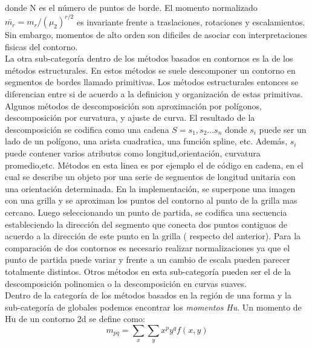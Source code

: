 donde N es el número de puntos de borde. El momento normalizado $\bar{m_r}=m_r / (\mu_2)^{r/2}$
es invariante frente a traslaciones, rotaciones y escalamientos. Sin embargo, momentos de alto orden
son dificiles de asociar con interpretaciones fisicas del contorno.\\
\indent La otra sub-categoría dentro de los métodos basados en contornos es la de los métodos estructurales.
En estos métodos se suele descomponer un contorno en segmentos de bordes llamado primitivas. Los métodos estructurales
entonces se diferencian entre si de acuerdo a la definicion y organización de estas primitivas. Algunos métodos
de descomposición son aproximación por polígonos, descomposición por curvatura, y ajuste de curva. El resultado
de la descomposición se codifica como una cadena $S=s_1,s_2...s_n$ donde $s_i$ puede ser un lado de un polígono, una 
arista cuadratica, una función spline, etc. Además, $s_i$ puede contener varios atributos como longitud,orientación, curvatura promedio,etc.
Métodos en esta linea es por ejemplo el de código en cadena, en el cual se describe un objeto por una serie de segmentos de longitud unitaria
con una orientación determinada. En la implementación, se superpone una imagen con una grilla y se aproximan los puntos del contorno al 
punto de la grilla mas cercano. Luego seleccionando un punto de partida, se codifica una secuencia estableciendo la dirección del segmento
que conecta dos puntos contiguos de acuerdo a la dirección de este punto en la grilla ( respecto del anterior). Para la comparación de dos
contornos es necesario realizar normalizaciones ya que el punto de partida puede variar y frente a un cambio de escala pueden parecer totalmente
distintos. Otros métodos en esta sub-categoría pueden ser el de la descomposición polinomica o la descomposición en curvas suaves. \\
\indent Dentro de la categoría de los métodos basados en la región de una forma y la sub-categoría de globales podemos encontrar los \textit{momentos Hu}.
Un momento de Hu de un contorno 2d se define como:
\[
	m_{pq}=\sum_{x}{\sum_{y}{x^py^qf(x,y)}}
\]

